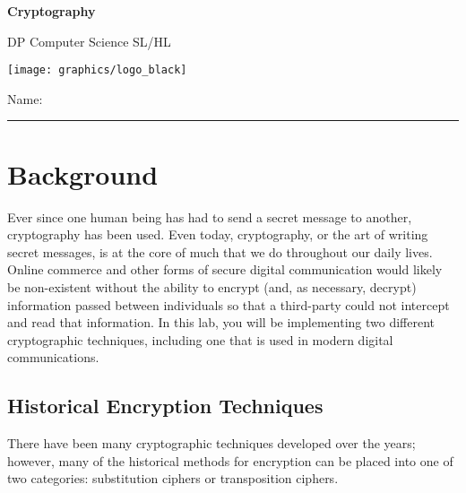 

\def\LabCourse{DP Computer Science SL/HL}
\def\LabNumber{01}
\def\LabTitle{Cryptography}


	\begin{coverpages}
		\vfill 
		\begin{center}
			\huge
			\textbf{\LabTitle}

			\Large
			\LabCourse
		\end{center}

		\vfill

		\begin{center}
			\texttt{[image: graphics/logo\_black]}

			\vspace{2.5cm}
		\end{center}

		\vfill 

		\begin{center}
			\Large
			Name: \rule{11.5cm}{0.1pt}
		\end{center}
	\end{coverpages}

	\blankpage

	\thispagestyle{empty}
	\tableofcontents

	\pagebreak

	\section{Background}
		Ever since one human being has had to send a secret message to another, cryptography has been used. Even today, cryptography, or the art of writing secret messages, is at the core of much that we do throughout our daily lives. Online commerce and other forms of secure digital communication would likely be non-existent without the ability to encrypt (and, as necessary, decrypt) information passed between individuals so that a third-party could not intercept and read that information. In this lab, you will be implementing two different cryptographic techniques, including one that is used in modern digital communications.
		\subsection{Historical Encryption Techniques}
			There have been many cryptographic techniques developed over the years; however, many of the historical methods for encryption can be placed into one of two categories: substitution ciphers or transposition ciphers.
